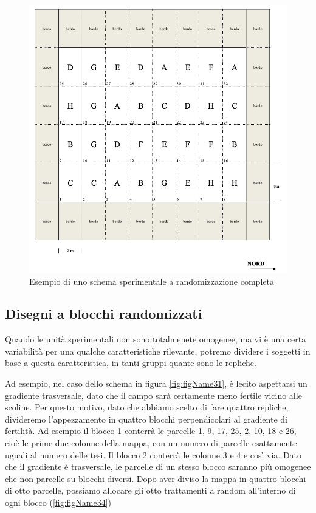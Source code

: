 \documentclass[a4paper,12pt,oneside]{book}
\begin{document}
\begin{figure}

{\centering \includegraphics[width=0.9\linewidth]{_images/Mappa1CRD} 

}

\caption{Esempio di uno schema sperimentale a randomizzazione completa}\label{fig:figName33}
\end{figure}

\hypertarget{disegni-a-blocchi-randomizzati}{%
\subsection{Disegni a blocchi randomizzati}\label{disegni-a-blocchi-randomizzati}}

Quando le unità sperimentali non sono totalmenete omogenee, ma vi è una certa variabilità per una qualche caratteristiche rilevante, potremo dividere i soggetti in base a questa caratteristica, in tanti gruppi quante sono le repliche.

Ad esempio, nel caso dello schema in figura \ref{fig:figName31}, è lecito aspettarsi un gradiente trasversale, dato che il campo sarà certamente meno fertile vicino alle scoline. Per questo motivo, dato che abbiamo scelto di fare quattro repliche, divideremo l'appezzamento in quattro blocchi perpendicolari al gradiente di fertilità. Ad esempio il blocco 1 conterrà le parcelle 1, 9, 17, 25, 2, 10, 18 e 26, cioè le prime due colonne della mappa, con un numero di parcelle esattamente uguali al numero delle tesi. Il blocco 2 conterrà le colonne 3 e 4 e così via. Dato che il gradiente è trasversale, le parcelle di un stesso blocco saranno più omogenee che non parcelle su blocchi diversi. Dopo aver diviso la mappa in quattro blocchi di otto parcelle, possiamo allocare gli otto trattamenti a random all'interno di ogni blocco (\ref{fig:figName34})
\end{document}
